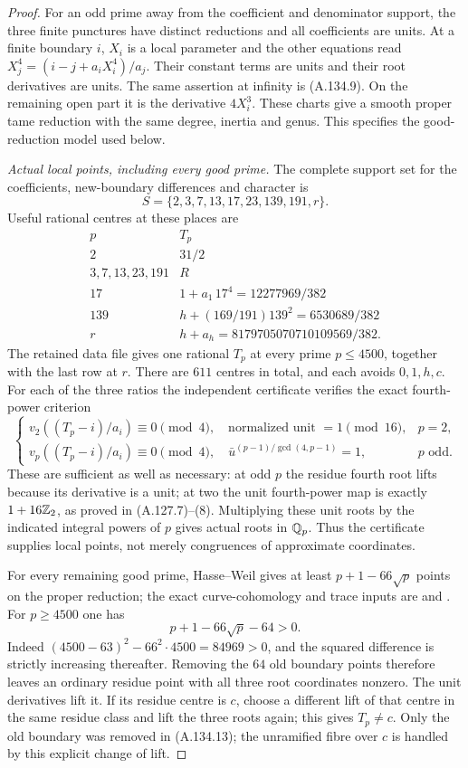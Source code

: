 \begin{proof}
For an odd prime away from the coefficient and
denominator support, the three finite punctures
have distinct reductions and all coefficients are
units.
At a finite boundary $i$, $X_i$ is a local
parameter and the other equations read
$X_j^4=(i-j+a_iX_i^4)/a_j$.
Their constant terms are units and their root
derivatives are units.
The same assertion at infinity is (A.134.9).
On the remaining open part it is the derivative
$4X_i^3$.
These charts give a smooth proper tame reduction
with the same degree, inertia and genus.
This specifies the good-reduction model used below.

\emph{Actual local points, including every good prime.}
The complete support set for the coefficients,
new-boundary differences and character is
\[
                         S=\{2,3,7,13,17,23,139,191,r\}.
\tag{A.134.10}
\]
Useful rational centres at these places are
\[
 \begin{array}{c|c}
 p&T_p\\ \hline
 2&31/2\\
 3,7,13,23,191&R\\
 17&1+a_1\,17^4=12277969/382\\
 139&h+(169/191)139^2=6530689/382\\
 r&h+a_h=8179705070710109569/382.
 \end{array}
\tag{A.134.11}
\]
The retained data file gives one rational $T_p$
at every prime $p\le4500$, together with the last
row at $r$.
There are $611$ centres in total, and each avoids
$0,1,h,c$.
For each of the three ratios the independent
certificate verifies the exact fourth-power criterion
\[
 \begin{cases}
 v_2((T_p-i)/a_i)\equiv0\pmod4,\quad
       \text{normalized unit }=1\pmod{16},&p=2,\\
 v_p((T_p-i)/a_i)\equiv0\pmod4,\quad
       \bar u^{(p-1)/\gcd(4,p-1)}=1,&p\text{ odd}.
 \end{cases}
\tag{A.134.12}
\]
These are sufficient as well as necessary:
at odd $p$ the residue fourth root lifts because
its derivative is a unit; at two the unit
fourth-power map is exactly $1+16\mathbb Z_2$, as proved
in (A.127.7)--(8).
Multiplying these unit roots by the indicated
integral powers of $p$ gives actual roots in $\mathbb Q_p$.
Thus the certificate supplies local points, not
merely congruences of approximate coordinates.

For every remaining good prime, Hasse--Weil gives
at least $p+1-66\sqrt p$ points on the proper
reduction; the exact curve-cohomology and trace
inputs are
\cite[Proposition 14.2]{AgentMilneLEC} and
\cite[(1.5.1), Theorem (1.6)]{AgentDeligneWeilI}.
For $p\ge4500$ one has
\[
                         p+1-66\sqrt p-64>0.
\tag{A.134.13}
\]
Indeed $(4500-63)^2-66^2\cdot4500=84969>0$,
and the squared difference is strictly increasing
thereafter.
Removing the $64$ old boundary points therefore
leaves an ordinary residue point with all three
root coordinates nonzero.
The unit derivatives lift it.
If its residue centre is $c$, choose a different
lift of that centre in the same residue class and
lift the three roots again; this gives $T_p\ne c$.
Only the old boundary was removed in (A.134.13);
the unramified fibre over $c$ is handled by this
explicit change of lift.


\end{proof}
